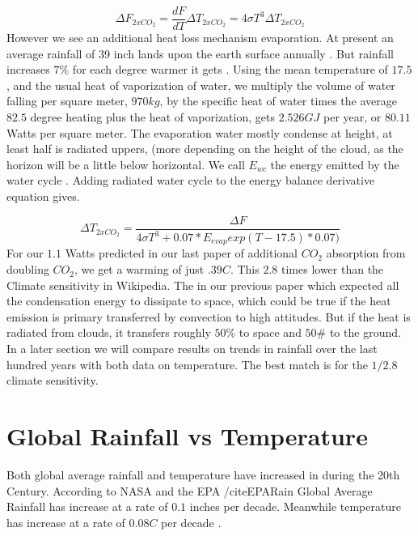 \documentclass{book}
\begin{document}
	\begin{equation}
		\Delta F_{2xCO_2} = \frac{dF}{dT} \Delta T_{2xCO_2}  = 4\sigma T^3 \Delta T_{2xCO_2} 
	\end{equation}
	However we see an additional heat loss mechanism evaporation. At present an average rainfall of 39 inch lands upon the earth surface annually \cite{rainfall}. But rainfall increases $7\%$ for each degree warmer it gets \cite{rainrise}.
	Using the mean temperature of $17.5$, and the usual heat of vaporization of water, we multiply the volume of water falling per square meter, $970kg$, by the specific heat of water times the average $82.5$ degree heating plus the heat of vaporization, gets $2.526GJ$ per year, or $80.11$ Watts per square meter. The evaporation water mostly condense at height, at least half is radiated uppers, (more depending on the height of the cloud, as the horizon will be a little below horizontal. We call $E_{wc}$ the energy emitted by the water cycle . Adding radiated water cycle to the energy balance derivative equation gives.	
	
	
	\begin{equation}
		\Delta T_{2xCO_2} = \frac{ \Delta F}{ 4\sigma T^3 + 0.07 * E_{evap} exp( T-17.5)*0.07)}
	\end{equation}
	For our $1.1$ Watts predicted in our last paper \cite{Adams1} of additional $CO_2$ absorption from doubling $CO_2$, we get a warming of just $.39 C$. This $2.8$ times lower than the \cite{wikisense} Climate sensitivity in Wikipedia. The in our previous paper \cite{Adams1} which expected all the condensation energy to dissipate to space, which could be true if the heat emission is primary transferred by convection to high attitudes. But if the heat is radiated from clouds, it transfers roughly $50\%$ to space and $50\#$ to the ground.	In a later section we will compare results on trends in rainfall over the last hundred years with both data on temperature. The best match is for the $1/2.8$ climate sensitivity.
	
	
	\section{Global Rainfall vs Temperature}
	
	Both global average rainfall and temperature have increased in during the 20th Century. According to NASA and the EPA /cite{EPARain} Global Average Rainfall has increase at a rate of $0.1$ inches per decade.
	Meanwhile temperature has increase at a rate of $0.08 C$ per decade \cite{GlobTemp}.
	
\end{document}
